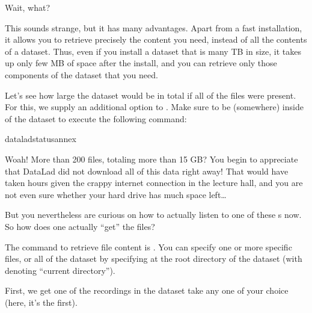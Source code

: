 \sphinxAtStartPar
Wait, what?

\sphinxAtStartPar
This sounds strange, but it has many advantages. Apart from a fast installation,
it allows you to retrieve precisely the content you need, instead of all the contents
of a dataset. Thus, even if you install a dataset that is many TB in size,
it takes up only few MB of space after the install, and you can retrieve only those
components of the dataset that you need.

\sphinxAtStartPar
Let’s see how large the dataset would be in total if all of the files were present.
For this, we supply an additional option to . Make sure to be
(somewhere) inside of the  dataset to execute the following command:

\begin{sphinxVerbatim}[commandchars=\\\{\}]
dataladstatus\PYGZhy{}\PYGZhy{}annex
\end{sphinxVerbatim}

\sphinxAtStartPar
Woah! More than 200 files, totaling more than 15 GB?
You begin to appreciate that DataLad did not
download all of this data right away! That would have taken hours given the crappy
internet connection in the lecture hall, and you are not even sure whether your
hard drive has much space left…

\sphinxAtStartPar
But you nevertheless are curious on how to actually listen to one of these s now.
So how does one actually “get” the files?

\ignorespaces 
\sphinxAtStartPar
The command to retrieve file content is .
You can specify one or more specific files, or  all of the dataset by
specifying  at the root directory of the dataset (with  denoting “current directory”).

\ignorespaces 
\sphinxAtStartPar
First, we get one of the recordings in the dataset \textendash{} take any one of your choice
(here, it’s the first).

